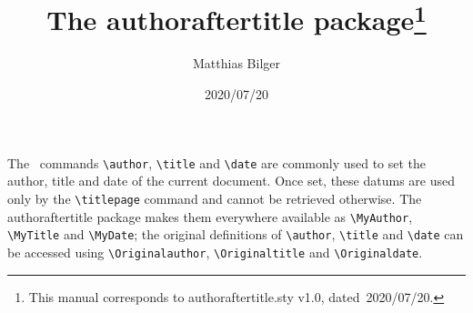 \documentclass[pagesize=auto]{scrartcl}
\title{The \textsf{authoraftertitle} package\thanks{This manual corresponds to \textsf{authoraftertitle.sty} v1.0, dated~2020/07/20.}}
\author{Matthias Bilger}
\date{2020/07/20}
\begin{document}
\maketitle

\noindent
The \LaTeXe\ commands \verb+\author+, \verb+\title+ and \verb+\date+ are commonly used to set the author, title and date of the current document.
Once set, these datums are used only by the \verb+\titlepage+ command and cannot be retrieved otherwise. The \textsf{authoraftertitle} package makes them everywhere available as \verb+\MyAuthor+, \verb+\MyTitle+ and \verb+\MyDate+; the original definitions of \verb+\author+, \verb+\title+ and \verb+\date+ can be accessed using \verb+\Originalauthor+, \verb+\Originaltitle+ and \verb+\Originaldate+.
\end{document}

